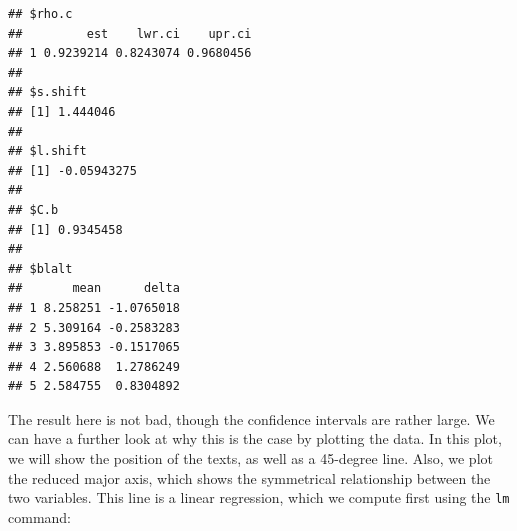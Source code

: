 \documentclass[
]{book}
\newenvironment{Shaded}{\begin{snugshade}}{\end{snugshade}}
\newcommand{\AttributeTok}[1]{\textcolor[rgb]{0.13,0.29,0.53}{#1}}
\newcommand{\ConstantTok}[1]{\textcolor[rgb]{0.56,0.35,0.01}{#1}}
\newcommand{\DecValTok}[1]{\textcolor[rgb]{0.00,0.00,0.81}{#1}}
\newcommand{\FloatTok}[1]{\textcolor[rgb]{0.00,0.00,0.81}{#1}}
\newcommand{\FunctionTok}[1]{\textcolor[rgb]{0.13,0.29,0.53}{\textbf{#1}}}
\newcommand{\NormalTok}[1]{#1}
\newcommand{\OtherTok}[1]{\textcolor[rgb]{0.56,0.35,0.01}{#1}}
\newcommand{\SpecialCharTok}[1]{\textcolor[rgb]{0.81,0.36,0.00}{\textbf{#1}}}
\newcommand{\StringTok}[1]{\textcolor[rgb]{0.31,0.60,0.02}{#1}}
\begin{document}
\begin{Shaded}
\end{Shaded}

\begin{verbatim}
## $rho.c
##         est    lwr.ci    upr.ci
## 1 0.9239214 0.8243074 0.9680456
## 
## $s.shift
## [1] 1.444046
## 
## $l.shift
## [1] -0.05943275
## 
## $C.b
## [1] 0.9345458
## 
## $blalt
##       mean      delta
## 1 8.258251 -1.0765018
## 2 5.309164 -0.2583283
## 3 3.895853 -0.1517065
## 4 2.560688  1.2786249
## 5 2.584755  0.8304892
\end{verbatim}

The result here is not bad, though the confidence intervals are rather large. We can have a further look at why this is the case by plotting the data. In this plot, we will show the position of the texts, as well as a 45-degree line. Also, we plot the reduced major axis, which shows the symmetrical relationship between the two variables. This line is a linear regression, which we compute first using the \texttt{lm} command:
\end{document}
